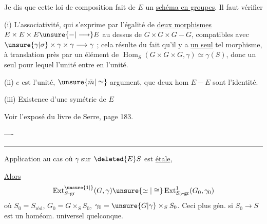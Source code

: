 Je dis que cette loi de composition fait de $E$ un \uline{schéma en groupes}. Il faut vérifier

(i) L'associativité, qui s'exprime par l'égalité de \uline{deux morphismes} $E\times E\times E\unsure{-|\longrightarrow}E$ au dessus de $G\times G\times G-G$, compatibles avec $\unsure{\gamma|\sigma}\times\gamma\times\gamma\longrightarrow\gamma$ ; cela résulte du fait qu'il y a \uline{un seul} tel morphisme, à translation près par un élément de $\operatorname{Hom}_S(G\times G\times G,\gamma)\simeq\gamma(S)$, donc un seul pour lequel l'unité entre en l'unité.

(ii) $e$ est l'unité, $\unsure{\bar m|\simeq}$ argument,   que deux hom $E-E$ sont l'identité.

(iii) Existence d'une symétrie de $E$

Voir l'exposé du livre de Serre, page 183.

\noindent ----

\noindent\rule{.72\linewidth}{.3pt}

Application au cas où $\gamma$ sur $\deleted{E}S$ est \uline{étale}, 

\uline{Alors}
\[
\operatorname{Ext}^{\unsure{1|{}}}_{S\text{-gr}}(G,\gamma)\unsure{\simeq|\cong}\operatorname{Ext}^{1}_{S_0\text{-gr}}(G_0,\gamma_0)
\]
où $S_0=S_{\mathrm{réd}}$, $G_0=G\times_S S_0$, $\gamma_0=\unsure{G|\gamma}\times_S S_0$. Ceci  plus gén. si $S_0\longrightarrow S$ est un homéom. universel quelconque. 

